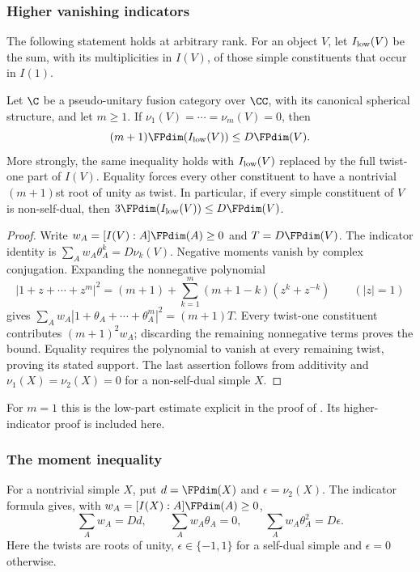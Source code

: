 \subsubsection{Higher vanishing indicators}
The following statement holds at arbitrary rank. For an object $V$, let
$I_{\rm low}(V)$ be the sum, with its multiplicities in $I(V)$, of those
simple constituents that occur in $I(1)$.

\begin{theorem}\label{finite:thm:higher-indicator}
Let $\C$ be a pseudo-unitary fusion category over $\CC$, with its
canonical spherical structure, and let $m\geq1$. If
$\nu_1(V)=\cdots=\nu_m(V)=0$, then
\[
 (m+1)\FPdim(I_{\rm low}(V))\leq D\FPdim(V).
\]
More strongly, the same inequality holds with $I_{\rm low}(V)$ replaced
by the full twist-one part of $I(V)$. Equality forces every other
constituent to have a nontrivial $(m+1)$st root of unity as twist.
In particular, if every simple constituent of $V$ is non-self-dual, then
$3\FPdim(I_{\rm low}(V))\leq D\FPdim(V)$.
\end{theorem}
\begin{proof}
Write $w_A=[I(V):A]\FPdim(A)\geq0$ and $T=D\FPdim(V)$.
The indicator identity \cite[Theorem 4.1]{NS} is
$\sum_Aw_A\theta_A^k=D\nu_k(V)$. Negative moments vanish by complex
conjugation. Expanding the nonnegative polynomial
\[
 |1+z+\cdots+z^m|^2=(m+1)+
 \sum_{k=1}^m(m+1-k)(z^k+z^{-k})\qquad(|z|=1)
\]
gives $\sum_Aw_A|1+\theta_A+\cdots+\theta_A^m|^2=(m+1)T$.
Every twist-one constituent contributes $(m+1)^2w_A$; discarding the
remaining nonnegative terms proves the bound. Equality requires the
polynomial to vanish at every remaining twist, proving its stated support.
The last assertion follows from additivity and
$\nu_1(X)=\nu_2(X)=0$ for a non-self-dual simple $X$.
\end{proof}
For $m=1$ this is the low-part estimate explicit in the proof of
\cite[Theorem 2.21]{Ostrik3}. Its higher-indicator proof is included here. 

\subsubsection{The moment inequality}
For a nontrivial simple $X$, put $d=\FPdim(X)$ and $\epsilon=\nu_2(X)$.
The indicator formula \cite[Theorem 4.1]{NS} gives, with
$w_A=[I(X):A]\FPdim(A)\geq0$,
\begin{equation}\label{finite:eq:three-moments}
 \sum_A w_A=Dd,\qquad \sum_A w_A\theta_A=0,\qquad
 \sum_A w_A\theta_A^2=D\epsilon.
\end{equation}
Here the twists are roots of unity, $\epsilon\in\{-1,1\}$ for a self-dual
simple and $\epsilon=0$ otherwise.

